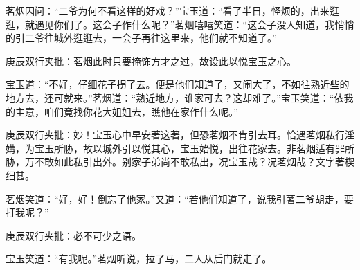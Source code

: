\begin{parag}
    茗烟因问：“二爷为何不看这样的好戏？”宝玉道：“看了半日，怪烦的，出来逛逛，就遇见你们了。这会子作什么呢？”茗烟嘻嘻笑道：“这会子没人知道，我悄悄的引二爷往城外逛逛去，一会子再往这里来，他们就不知道了。”\begin{note}庚辰双行夹批：茗烟此时只要掩饰方才之过，故设此以悦宝玉之心。\end{note}宝玉道：“不好，仔细花子拐了去。便是他们知道了，又闹大了，不如往熟近些的地方去，还可就来。”茗烟道：“熟近地方，谁家可去？这却难了。”宝玉笑道：“依我的主意，咱们竟找你花大姐姐去，瞧他在家作什么呢。”\begin{note}庚辰双行夹批：妙！宝玉心中早安著这著，但恐茗烟不肯引去耳。恰遇茗烟私行淫媾，为宝玉所胁，故以城外引以悦其心，宝玉始悦，出往花家去。非茗烟适有罪所胁，万不敢如此私引出外。别家子弟尚不敢私出，况宝玉哉？况茗烟哉？文字著楔细甚。\end{note}茗烟笑道：“好，好！倒忘了他家。”又道：“若他们知道了，说我引著二爷胡走，要打我呢？”\begin{note}庚辰双行夹批：必不可少之语。\end{note}宝玉笑道：“有我呢。”茗烟听说，拉了马，二人从后门就走了。
\end{parag}


